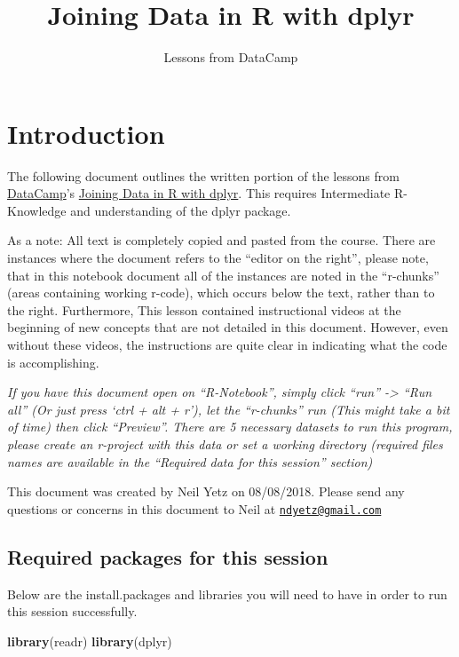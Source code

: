 \documentclass[]{article}
\title{Joining Data in R with dplyr}
\subtitle{Lessons from DataCamp}
\author{}
\date{}
\newenvironment{Shaded}{\begin{snugshade}}{\end{snugshade}}
\newcommand{\KeywordTok}[1]{\textcolor[rgb]{0.13,0.29,0.53}{\textbf{#1}}}
\newcommand{\NormalTok}[1]{#1}
\begin{document}
\maketitle

{
\setcounter{tocdepth}{3}
\tableofcontents
}
\section{Introduction}\label{introduction}

The following document outlines the written portion of the lessons from
\href{https://www.datacamp.com/}{DataCamp}'s
\href{https://www.datacamp.com/courses/joining-data-in-r-with-dplyr}{Joining
Data in R with dplyr}. This requires Intermediate R-Knowledge and
understanding of the dplyr package.

As a note: All text is completely copied and pasted from the course.
There are instances where the document refers to the ``editor on the
right'', please note, that in this notebook document all of the
instances are noted in the ``r-chunks'' (areas containing working
r-code), which occurs below the text, rather than to the right.
Furthermore, This lesson contained instructional videos at the beginning
of new concepts that are not detailed in this document. However, even
without these videos, the instructions are quite clear in indicating
what the code is accomplishing.

\emph{If you have this document open on ``R-Notebook'', simply click
``run'' -\textgreater{} ``Run all'' (Or just press `ctrl + alt + r'),
let the ``r-chunks'' run (This might take a bit of time) then click
``Preview''. There are 5 necessary datasets to run this program, please
create an r-project with this data or set a working directory (required
files names are available in the ``Required data for this session''
section)}

This document was created by Neil Yetz on 08/08/2018. Please send any
questions or concerns in this document to Neil at
\href{mailto:ndyetz@gmail.com}{\nolinkurl{ndyetz@gmail.com}}

\subsection{Required packages for this
session}\label{required-packages-for-this-session}

Below are the install.packages and libraries you will need to have in
order to run this session successfully.

\begin{Shaded}
\begin{Highlighting}[]
\KeywordTok{library}\NormalTok{(readr)}
\KeywordTok{library}\NormalTok{(dplyr)}
\end{Highlighting}
\end{Shaded}
\end{document}
